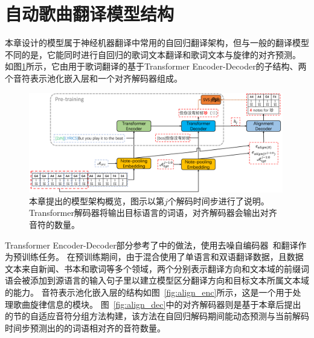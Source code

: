 \section{自动歌曲翻译模型结构}
本章设计的模型属于神经机器翻译中常用的自回归翻译架构，但与一般的翻译模型不同的是，它能同时进行自回归的歌词文本翻译和歌词文本与旋律的对齐预测。
如图\ref{fig:model}所示，它由用于歌词翻译的基于Transformer Encoder-Decoder的子结构、两个音符表示池化嵌入层和一个对齐解码器组成。
\begin{figure}[t]
    \centering
    \includegraphics[width=0.99\textwidth]{figure/ast/pipeline_svs.pdf}
    \caption{本章提出的模型架构概览，图示以第$j$个解码时间步进行了说明。Transformer解码器将输出目标语言的词语，对齐解码器会输出对齐音符的数量。}
    \label{fig:model}
\end{figure}
Transformer Encoder-Decoder部分参考了\citet{gagast}中的做法，使用去噪自编码器~\citep{bart}和翻译作为预训练任务。
在预训练期间，由于混合使用了单语言和双语翻译数据，且数据文本来自新闻、书本和歌词等多个领域，两个分别表示翻译方向和文本域的前缀词语会被添加到源语言的输入句子里以建立模型区分翻译方向和目标文本所属文本域的能力。
音符表示池化嵌入层的结构如图~\ref{fig:align_enc}所示，这是一个用于处理歌曲旋律信息的模块。
图~\ref{fig:align_dec}中的对齐解码器则是基于本章后提出的节的自适应音符分组方法构建，该方法在自回归解码期间能动态预测与当前解码时间步预测出的的词语相对齐的音符数量。
